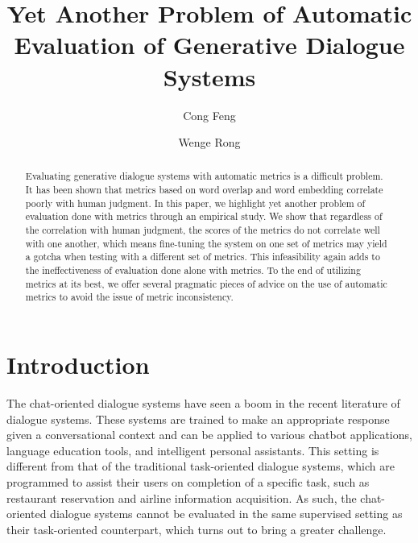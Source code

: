 \documentclass[runningheads]{llncs}
\begin{document}
    \title{Yet Another Problem of Automatic Evaluation of Generative Dialogue Systems}


    \author{Cong Feng \and Wenge Rong}



    \maketitle

    \begin{abstract}
        Evaluating generative dialogue systems with automatic metrics is a difficult problem. It has been shown that metrics based on word overlap and word embedding correlate poorly with human judgment. In this paper, we highlight yet another problem of evaluation done with metrics through an empirical study. We show that regardless of the correlation with human judgment, the scores of the metrics do not correlate well with one another, which means fine-tuning the system on one set of metrics may yield a gotcha when testing with a different set of metrics. This infeasibility again adds to the ineffectiveness of evaluation done alone with metrics. To the end of utilizing metrics at its best, we offer several pragmatic pieces of advice on the use of automatic metrics to avoid the issue of metric inconsistency.
    \end{abstract}


    \section{Introduction}
    The chat-oriented dialogue systems have seen a boom in the recent literature of dialogue systems. These systems are trained to make an appropriate response given a conversational context and can be applied to various chatbot applications, language education tools, and intelligent personal assistants. This setting is different from that of the traditional task-oriented dialogue systems, which are programmed to assist their users on completion of a specific task, such as restaurant reservation and airline information acquisition. As such, the chat-oriented dialogue systems cannot be evaluated in the same supervised setting as their task-oriented counterpart, which turns out to bring a greater challenge.
\end{document}
